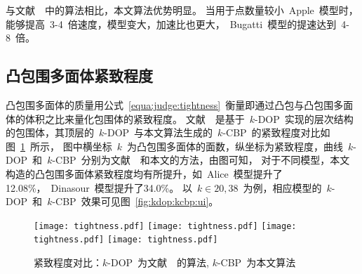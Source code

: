与文献~~中的算法相比，本文算法优势明显。
当用于点数量较小~Apple~模型时，能够提高~3-4~倍速度，模型变大，加速比也更大，~Bugatti~模型的提速达到~4-8~倍。

\subsection{凸包围多面体紧致程度}
\label{subsec:exper:tightness}

凸包围多面体的质量用公式~\ref{equa:judge:tightness}~衡量即通过凸包与凸包围多面体的体积之比来量化包围体的紧致程度。
文献~~是基于~$k$-DOP~实现的层次结构的包围体，其顶层的~$k$-DOP~与本文算法生成的~$k$-CBP~的紧致程度对比如图~\ref{chart:exps:tightness}~所示，
图中横坐标~$k$~为凸包围多面体的面数，纵坐标为紧致程度，曲线~$k$-DOP~和~$k$-CBP~分别为文献~~和本文的方法，由图可知，
对于不同模型，本文构造的凸包围多面体紧致程度均有所提升，如~Alice~模型提升了12.08\%，~Dinasour~模型提升了34.0\%。
以~$k \in {20,38}$~为例，相应模型的~$k$-DOP~和~$k$-CBP~效果可见图~\ref{fig:kdop:kcbp:ui}。

\begin{figure}[htbp] 
\centering
{}
{
    \texttt{[image: tightness.pdf]}
}
{  
   \texttt{[image: tightness.pdf]}
}
\linebreak
{}
{  
    \texttt{[image: tightness.pdf]}
}
{  
   \texttt{[image: tightness.pdf]}
}
\caption{紧致程度对比：$k$-DOP~为文献~~的算法, $k$-CBP~为本文算法}
\label{chart:exps:tightness}
\end{figure}

